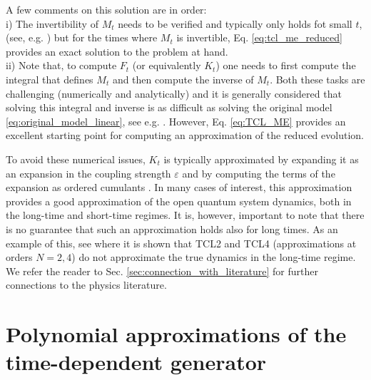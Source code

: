 \documentclass[10pt,aps,pra,twocolumn,showpacs,superscriptaddress,nobalancelastpage,notitlepage,nofootinbib,longbibliography]{revtex4-2}
\begin{document}
A few comments on this solution are in order:\\ 
i) The invertibility of $M_t$ needs to be verified and typically only holds fot small $t$, (see, e.g. \cite{breuer2002theory}) but for the times where $M_t$ is invertible, Eq. \eqref{eq:tcl_me_reduced} provides an exact solution to the problem at hand. \\
ii) Note that, to compute $F_t$ (or equivalently $K_t$) one needs to first compute the integral that defines $M_t$ and then compute the inverse of $M_t$. Both these tasks are challenging (numerically and analytically) and it is generally considered that solving this integral and inverse is as difficult as solving the original model \eqref{eq:original_model_linear}, see e.g. \cite{breuer2007}. However, Eq. \eqref{eq:TCL_ME} provides an excellent starting point for computing an approximation of the reduced evolution. 

To avoid these numerical issues, $K_t$ is typically approximated by expanding it as an expansion in the coupling strength $\varepsilon$ and by computing the terms of the expansion as ordered cumulants \cite{breuer2002theory,breuer2006,nestmann2019time}.
In many cases of interest, this approximation provides a good approximation of the open quantum system dynamics, both in the long-time and short-time regimes. It is, however, important to note that there is no guarantee that such an approximation holds also for long times. As an example of this, see \cite{breuer2007} where it is shown that TCL2 and TCL4 (approximations at orders $N=2,4$) do not approximate the true dynamics in the long-time regime.
We refer the reader to Sec. \ref{sec:connection_with_literature} for further connections to the physics literature.

\section{Polynomial approximations of the time-dependent generator}
\label{sec:time_ordered}
\end{document}
